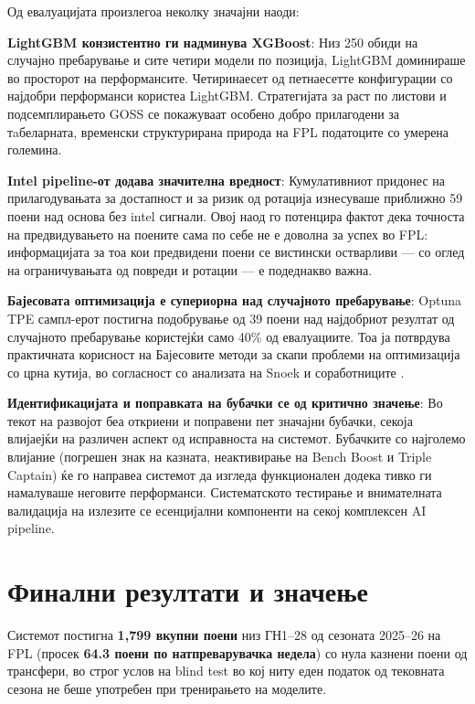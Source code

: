 Од евалуацијата произлегоа неколку значајни наоди:

\textbf{LightGBM конзистентно ги надминува XGBoost}: Низ 250 обиди на случајно пребарување и сите четири модели по позиција, LightGBM доминираше во просторот на перформансите. Четиринаесет од петнаесетте конфигурации со најдобри перформанси користеа LightGBM. Стратегијата за раст по листови и подсемплирањето GOSS се покажуваат особено добро прилагодени за тaбеларната, временски структурирана природа на FPL податоците со умерена големина.

\textbf{Intel pipeline-от додава значителна вредност}: Кумулативниот придонес на прилагодувањата за достапност и за ризик од ротација изнесуваше приближно 59 поени над основа без intel сигнали. Овој наод го потенцира фактот дека точноста на предвидувањето на поените сама по себе не е доволна за успех во FPL: информацијата за тоа кои предвидени поени се вистински остварливи — со оглед на ограничувањата од повреди и ротации — е подеднакво важна.

\textbf{Бајесовата оптимизација е супериорна над случајното пребарување}: Optuna TPE сампл-ерот постигна подобрување од 39 поени над најдобриот резултат од случајното пребарување користејќи само 40\% од евалуациите. Тоа ја потврдува практичната корисност на Бајесовите методи за скапи проблеми на оптимизација со црна кутија, во согласност со анализата на Snoek и соработниците \cite{snoek2012practical}.

\textbf{Идентификацијата и поправката на бубачки се од критично значење}: Во текот на развојот беа откриени и поправени пет значајни бубачки, секоја влијаејќи на различен аспект од исправноста на системот. Бубачките со најголемо влијание (погрешен знак на казната, неактивирање на Bench Boost и Triple Captain) ќе го направеа системот да изгледа функционален додека тивко ги намалуваше неговите перформанси. Систематското тестирање и внимателната валидација на излезите се есенцијални компоненти на секој комплексен AI pipeline.

\section{Финални резултати и значење}

Системот постигна \textbf{1{,}799 вкупни поени} низ ГН1--28 од сезоната 2025--26 на FPL (просек \textbf{64.3 поени по натпреварувачка недела}) со нула казнени поени од трансфери, во строг услов на blind test во кој ниту еден податок од тековната сезона не беше употребен при тренирањето на моделите.

